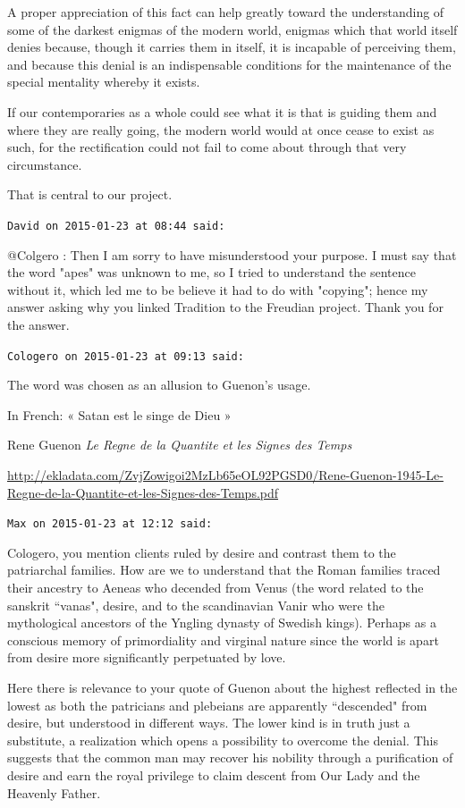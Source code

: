 \begin{footnotesize}
\begin{sffamily}
\begin{quotex}
A proper appreciation of this fact can help greatly toward the understanding of some of the darkest enigmas of the modern world, enigmas which that world itself denies because, though it carries them in itself, it is incapable of perceiving them, and because this denial is an indispensable conditions for the maintenance of the special mentality whereby it exists.

If our contemporaries as a whole could see what it is that is guiding them and where they are really going, the modern world would at once cease to exist as such, for the rectification could not fail to come about through that very circumstance. 

\end{quotex}
That is central to our project.


\hfill

\texttt{David on 2015-01-23 at 08:44 said: }

@Colgero : Then I am sorry to have misunderstood your purpose. I must say that the word "apes" was unknown to me, so I tried to understand the sentence without it, which led me to be believe it had to do with "copying"; hence my answer asking why you linked Tradition to the Freudian project. Thank you for the answer.


\hfill

\texttt{Cologero on 2015-01-23 at 09:13 said: }

The word was chosen as an allusion to Guenon's usage.

In French: « Satan est le singe de Dieu »

Rene Guenon \textit{Le Regne de la Quantite et les Signes des Temps}

\url{http://ekladata.com/ZvjZowigoi2MzLb65eOL92PGSD0/Rene-Guenon-1945-Le-Regne-de-la-Quantite-et-les-Signes-des-Temps.pdf}


\hfill

\texttt{Max on 2015-01-23 at 12:12 said: }

Cologero, you mention clients ruled by desire and contrast them to the patriarchal families. How are we to understand that the Roman families traced their ancestry to Aeneas who decended from Venus (the word related to the sanskrit ``vanas", desire, and to the scandinavian Vanir who were the mythological ancestors of the Yngling dynasty of Swedish kings). Perhaps as a conscious memory of primordiality and virginal nature since the world is apart from desire more significantly perpetuated by love.

Here there is relevance to your quote of Guenon about the highest reflected in the lowest as both the patricians and plebeians are apparently ``descended" from desire, but understood in different ways. The lower kind is in truth just a substitute, a realization which opens a possibility to overcome the denial. This suggests that the common man may recover his nobility through a purification of desire and earn the royal privilege to claim descent from Our Lady and the Heavenly Father.



\end{sffamily}
\end{footnotesize}
